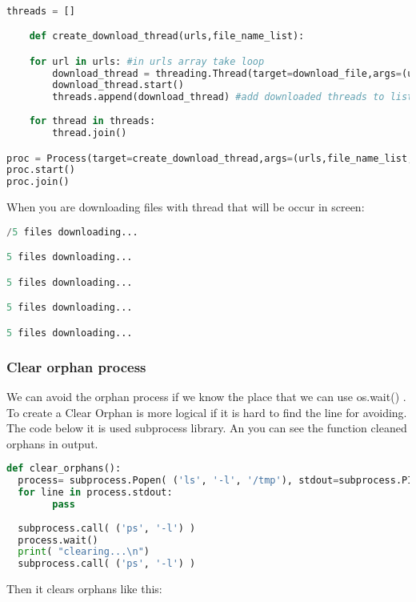 \documentclass[onecolumn]{article}
\begin{document}
\begin{lstlisting}[language=Python, caption=Creating Threads]

threads = []

    def create_download_thread(urls,file_name_list):

    for url in urls: #in urls array take loop
        download_thread = threading.Thread(target=download_file,args=(url,file_name_list,))
        download_thread.start()
        threads.append(download_thread) #add downloaded threads to list
        
    for thread in threads:
        thread.join()

proc = Process(target=create_download_thread,args=(urls,file_name_list,))
proc.start()
proc.join()

\end{lstlisting}

When you are downloading files with thread that will be occur in screen:

\begin{lstlisting}[language=Python, caption=Output]
/5 files downloading...

5 files downloading...

5 files downloading...

5 files downloading...

5 files downloading...
\end{lstlisting}


\subsubsection{Clear orphan process}

We can avoid the orphan process if we know the place that we can use os.wait() . To create a Clear Orphan  is more logical if it is hard to find the line for avoiding. The code below it is used subprocess library. An you can see the function cleaned orphans in output.

\begin{lstlisting}[language=Python, caption= Clear Orphans ]
def clear_orphans(): 
  process= subprocess.Popen( ('ls', '-l', '/tmp'), stdout=subprocess.PIPE)
  for line in process.stdout:
        pass
    
  subprocess.call( ('ps', '-l') )
  process.wait()
  print( "clearing...\n")
  subprocess.call( ('ps', '-l') )

\end{lstlisting}

Then it clears orphans like this:
\end{document}

